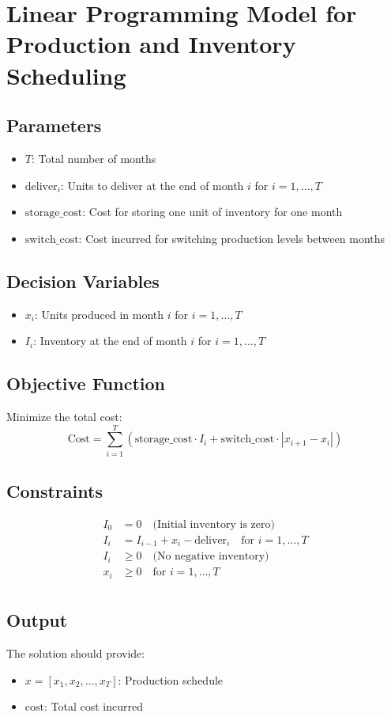 \documentclass{article}
\begin{document}
\section*{Linear Programming Model for Production and Inventory Scheduling}

\subsection*{Parameters}
\begin{itemize}
    \item \( T \): Total number of months
    \item \( \text{deliver}_i \): Units to deliver at the end of month \( i \) for \( i = 1, \ldots, T \)
    \item \( \text{storage\_cost} \): Cost for storing one unit of inventory for one month
    \item \( \text{switch\_cost} \): Cost incurred for switching production levels between months
\end{itemize}

\subsection*{Decision Variables}
\begin{itemize}
    \item \( x_i \): Units produced in month \( i \) for \( i = 1, \ldots, T \)
    \item \( I_i \): Inventory at the end of month \( i \) for \( i = 1, \ldots, T \)
\end{itemize}

\subsection*{Objective Function}
Minimize the total cost:
\[
\text{Cost} = \sum_{i=1}^{T} \left(\text{storage\_cost} \cdot I_i + \text{switch\_cost} \cdot |x_{i+1} - x_i|\right)
\]

\subsection*{Constraints}
\begin{align*}
    I_0 & = 0 \quad \text{(Initial inventory is zero)} \\
    I_i & = I_{i-1} + x_i - \text{deliver}_i \quad \text{for } i = 1, \ldots, T \\
    I_i & \geq 0 \quad \text{(No negative inventory)} \\
    x_i & \geq 0 \quad \text{for } i = 1, \ldots, T \\
\end{align*}

\subsection*{Output}
The solution should provide:
\begin{itemize}
    \item \( x = [x_1, x_2, \ldots, x_T] \): Production schedule
    \item \(\text{cost}\): Total cost incurred
\end{itemize}
\end{document}
